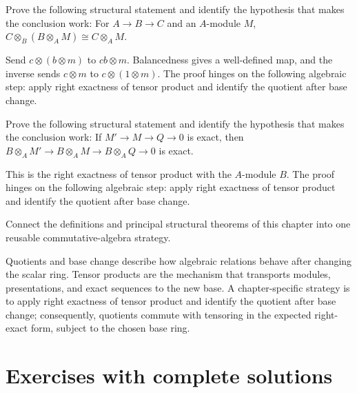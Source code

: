 \begin{problem}\label{prob:v11-problem-10}
Prove the following structural statement and identify the hypothesis that makes the conclusion work: For $A\to B\to C$ and an $A$-module $M$, $C\otimes_B(B\otimes_A M)\cong C\otimes_A M$.
\end{problem}
\begin{solution}
Send $c\otimes(b\otimes m)$ to $cb\otimes m$. Balancedness gives a well-defined map, and the inverse sends $c\otimes m$ to $c\otimes(1\otimes m)$. The proof hinges on the following algebraic step: apply right exactness of tensor product and identify the quotient after base change.
\end{solution}

\begin{problem}\label{prob:v11-problem-11}
Prove the following structural statement and identify the hypothesis that makes the conclusion work: If $M'\to M\to Q\to0$ is exact, then $B\otimes_A M'\to B\otimes_A M\to B\otimes_A Q\to0$ is exact.
\end{problem}
\begin{solution}
This is the right exactness of tensor product with the $A$-module $B$. The proof hinges on the following algebraic step: apply right exactness of tensor product and identify the quotient after base change.
\end{solution}

\begin{problem}\label{prob:v11-problem-12}
Connect the definitions and principal structural theorems of this chapter into one reusable commutative-algebra strategy.
\end{problem}
\begin{solution}
Quotients and base change describe how algebraic relations behave after changing the scalar ring. Tensor products are the mechanism that transports modules, presentations, and exact sequences to the new base. A chapter-specific strategy is to apply right exactness of tensor product and identify the quotient after base change; consequently, quotients commute with tensoring in the expected right-exact form, subject to the chosen base ring.
\end{solution}

\section{Exercises with complete solutions}

